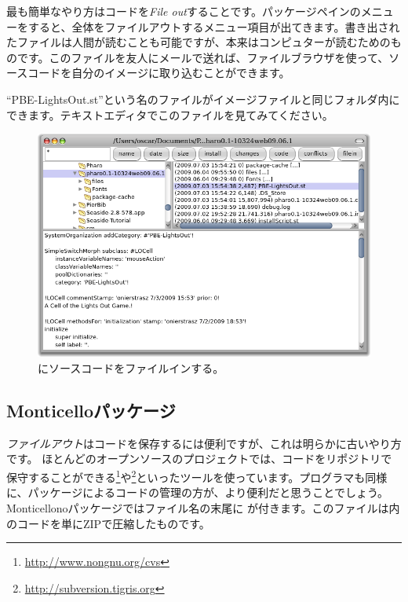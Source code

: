 \documentclass[a4paper,10pt,twoside]{book}
\begin{document}
最も簡単なやり方はコードを\emph{File out}することです。パッケージペインのメニューを\actclick すると、全体をファイルアウトするメニュー項目が出てきます。書き出されたファイルは人間が読むことも可能ですが、本来はコンピュターが読むためのものです。このファイルを友人にメールで送れば、ファイルブラウザを使って、ソースコードを自分の\pharo イメージに取り込むことができます。


``PBE-LightsOut.st''という名のファイルがイメージファイルと同じフォルダ内にできます。テキストエディタでこのファイルを見てみてください。


\begin{figure}[ht]
\centerline {\includegraphics[width=\textwidth]{FileIn}}
\caption{\pharo にソースコードをファイルインする。
}
\end{figure}

\subsection{Monticelloパッケージ}
\emph{ファイルアウト}はコードを保存するには便利ですが、これは明らかに古いやり方です。
ほとんどのオープンソースのプロジェクトでは、コードをリポジトリで保守することができる\footnote{\url{http://www.nongnu.org/cvs}}や\footnote{\url{http://subversion.tigris.org}}といったツールを使っています。\pharo プログラマも同様に、パッケージによるコードの管理の方が、より便利だと思うことでしょう。Monticellonoパッケージではファイル名の末尾に が付きます。このファイルは内のコードを単にZIPで圧縮したものです。
\end{document}

